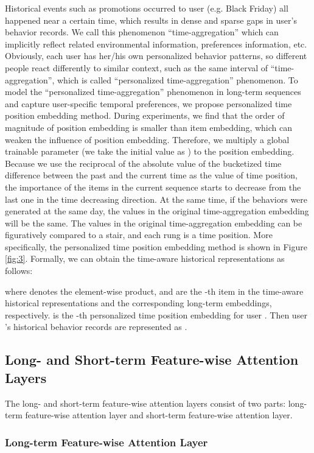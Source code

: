 \documentclass[preprint,12pt]{elsarticle}
\begin{document}
\begin{sloppypar}
Historical events such as promotions occurred to user (e.g. Black Friday) all happened near a certain time, which results in dense and sparse gaps in user's behavior records. We call this phenomenon ``time-aggregation'' which can implicitly reflect related environmental information, preferences information, etc. Obviously, each user has her/his own personalized behavior patterns, so different people react differently to similar context, such as the same interval of ``time-aggregation'', which is called ``personalized time-aggregation'' phenomenon. To model the ``personalized time-aggregation'' phenomenon in long-term sequences and capture user-specific temporal preferences, we propose personalized time position embedding method. During experiments, we find that the order of magnitude of position embedding is smaller than item embedding, which can weaken the influence of position embedding. Therefore, we multiply a global trainable parameter  (we take the initial value as ) to the position embedding. Because we use the reciprocal of the absolute value of the bucketized time difference between the past and the current time as the value of time position, the importance of the items in the current sequence starts to decrease from the last one in the time decreasing direction. At the same time, if the behaviors were generated at the same day, the values in the original time-aggregation embedding will be the same. The values in the original time-aggregation embedding can be figuratively compared to a stair, and each rung is a time position. More specifically, the personalized time position embedding method is shown in Figure \ref{fig:3}. Formally, we can obtain the time-aware historical representations as follows:

where  denotes the element-wise product,  and  are the -th item in the time-aware historical representations and the corresponding long-term embeddings, respectively.  is the -th personalized time position embedding for user . Then user 's historical behavior records are represented as .

\subsection{Long- and Short-term Feature-wise Attention Layers}
The long- and short-term feature-wise attention layers consist of two parts: long-term feature-wise attention layer and short-term feature-wise attention layer.
\subsubsection{Long-term Feature-wise Attention Layer}


\end{sloppypar}
\end{document}
